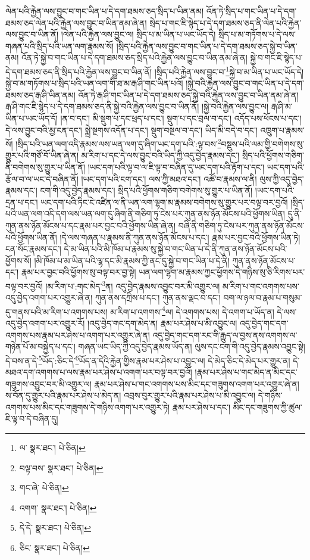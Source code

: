 ལེན་པའི་རྐྱེན་ལས་བྱུང་བ་གང་ཡིན་པ་དེ་དག་ཐམས་ཅད་སྲིད་པ་ཡིན་ནམ། འོན་ཏེ་སྲིད་པ་གང་ཡིན་པ་དེ་དག་ཐམས་ཅད་ལེན་པའི་རྐྱེན་ལས་བྱུང་བ་ཡིན་ནམ་ཞེ་ན། སྲེད་པ་གང་ཇི་སྙེད་པ་དེ་དག་ཐམས་ཅད་ནི་ལེན་པའི་རྐྱེན་ལས་བྱུང་བ་ཡིན་ནོ། །ལེན་པའི་རྐྱེན་ལས་བྱུང་ལ། སྲིད་པ་མ་ཡིན་པ་ཡང་ཡོད་དེ། སྲིད་པ་མ་གཏོགས་པ་དེ་ལས་གཞན་པའི་སྲིད་པའི་ཡན་ལག་རྣམས་སོ། །སྲིད་པའི་རྐྱེན་ལས་བྱུང་བ་གང་ཡིན་པ་དེ་དག་ཐམས་ཅད་སྐྱེ་བ་ཡིན་ནམ། འོན་ཏེ་སྐྱེ་བ་གང་ཡིན་པ་དེ་དག་ཐམས་ཅད་སྲིད་པའི་རྐྱེན་ལས་བྱུང་བ་ཡིན་ནམ་ཞེ་ན། སྐྱེ་བ་གང་ཇི་སྙེད་པ་དེ་དག་ཐམས་ཅད་ནི་སྲིད་པའི་རྐྱེན་ལས་བྱུང་བ་ཡིན་ནོ། །སྲིད་པའི་རྐྱེན་ལས་བྱུང་བ་\footnote{ལ་  སྣར་ཐང་།  པེ་ཅིན། }སྐྱེ་བ་མ་ཡིན་པ་ཡང་ཡོད་དེ། སྐྱེ་བ་མ་གཏོགས་པ་སྲིད་པའི་ཡན་ལག་གི་ཐ་མ་རྒ་ཤི་གང་ཡིན་པའོ། །སྐྱེ་བའི་རྐྱེན་ལས་བྱུང་བ་གང་ཡིན་པ་དེ་དག་ཐམས་ཅད་རྒ་ཤི་ཡིན་ནམ། འོན་ཏེ་རྒ་ཤི་གང་ཡིན་པ་དེ་དག་ཐམས་ཅད་སྐྱེ་བའི་རྐྱེན་ལས་བྱུང་བ་ཡིན་ནམ་ཞེ་ན། རྒ་ཤི་གང་ཇི་སྙེད་པ་དེ་དག་ཐམས་ཅད་ནི་སྐྱེ་བའི་རྐྱེན་ལས་བྱུང་བ་ཡིན་ནོ། །སྐྱེ་བའི་རྐྱེན་ལས་བྱུང་ལ། རྒ་ཤི་མ་ཡིན་པ་ཡང་ཡོད་དོ། །ན་བ་དང་། མི་སྡུག་པ་དང་ཕྲད་པ་དང་། སྡུག་པ་དང་བྲལ་བ་དང་། འདོད་པས་ཕོངས་པ་དང་། དེ་ལས་བྱུང་བའི་མྱ་ངན་དང་། སྨྲེ་སྔགས་འདོན་པ་དང་། སྡུག་བསྔལ་བ་དང་། ཡིད་མི་བདེ་བ་དང་། འཁྲུག་པ་རྣམས་སོ། །སྲིད་པའི་ཡན་ལག་འདི་རྣམས་ལས་ཡན་ལག་དུ་ཞིག་ཡང་དག་པའི་:ལྟ་བས་\footnote{བལྟ་བས་  སྣར་ཐང་།  པེ་ཅིན། }བསྡུས་པའི་ལམ་གྱི་བགེགས་སུ་གྱུར་པའི་གཙོ་བོ་ཡིན་ཞེ་ན། མ་རིག་པ་དང་དེ་ལས་བྱུང་བའི་ཡིད་ཀྱི་འདུ་བྱེད་རྣམས་དང་། སྲིད་པའི་ཕྱོགས་གཅིག་ནི་བགེགས་སུ་གྱུར་པ་ཡིན་ནོ། །ཡང་དག་པའི་ལྟ་བ་ལ་ཇི་ལྟ་བ་བཞིན་དུ་ཡང་དག་པའི་རྟོག་པ་དང་། ཡང་དག་པའི་རྩོལ་བ་ལ་ཡང་དེ་བཞིན་ནོ། །ཡང་དག་པའི་ངག་དང་། ལས་ཀྱི་མཐའ་དང་། འཚོ་བ་རྣམས་ལ་ནི། ལུས་ཀྱི་འདུ་བྱེད་རྣམས་དང་། ངག་གི་འདུ་བྱེད་རྣམས་དང་། སྲིད་པའི་ཕྱོགས་གཅིག་བགེགས་སུ་གྱུར་པ་ཡིན་ནོ། །ཡང་དག་པའི་དྲན་པ་དང་། ཡང་དག་པའི་ཏིང་ངེ་འཛིན་ལ་ནི་ཡན་ལག་ལྷག་མ་རྣམས་བགེགས་སུ་གྱུར་པར་བལྟ་བར་བྱའོ། །སྲིད་པའི་ཡན་ལག་འདི་དག་ལས་ཡན་ལག་དུ་ཞིག་ནི་གཅིག་ཏུ་ངེས་པར་ཀུན་ནས་ཉོན་མོངས་པའི་ཕྱོགས་ཡིན། དུ་ནི་ཀུན་ནས་ཉོན་མོངས་པ་དང་རྣམ་པར་བྱང་བའི་ཕྱོགས་ཡིན་ཞེ་ན། བཞི་ནི་གཅིག་ཏུ་ངེས་པར་ཀུན་ནས་ཉོན་མོངས་པའི་ཕྱོགས་ཡིན་ནོ། །དེ་ལས་གཞན་པ་རྣམས་ནི་ཀུན་ནས་ཉོན་མོངས་པ་དང་། རྣམ་པར་བྱང་བའི་ཕྱོགས་ཡིན་ཏེ། ངན་སོང་རྣམས་དང་། དེ་མ་ཡིན་པའི་མི་ཁོམ་པ་རྣམས་སུ་སྐྱེ་བ་གང་ཡིན་པ་དེ་ནི་ཀུན་ནས་ཉོན་མོངས་པའི་ཕྱོགས་སོ། །མི་ཁོམ་པ་མ་ཡིན་པའི་ལྷ་དང་མི་རྣམས་ཀྱི་ནང་དུ་སྐྱེ་བ་གང་ཡིན་པ་དེ་ནི། ཀུན་ནས་ཉོན་མོངས་པ་དང་། རྣམ་པར་བྱང་བའི་ཕྱོགས་སུ་བལྟ་བར་བྱ་སྟེ། ཡན་ལག་ལྷག་མ་རྣམས་ཀྱང་ཕྱོགས་དེ་གཉིས་སུ་ཅི་རིགས་པར་བལྟ་བར་བྱའོ། །མ་རིག་པ་:གང་མེད་\footnote{གང་ཞེ་  པེ་ཅིན། }ན། འདུ་བྱེད་རྣམས་འབྱུང་བར་མི་འགྱུར་ལ། མ་རིག་པ་གང་འགགས་པས་འདུ་བྱེད་འགག་པར་འགྱུར་ཞེ་ན། ཀུན་ནས་དཀྲིས་པ་དང་། ཀུན་ནས་ལྡང་བ་དང་། བག་ལ་ཉལ་བ་རྣམ་པ་གསུམ་དུ་གནས་པའི་མ་རིག་པ་འགགས་པས། མ་རིག་པ་འགགས་\footnote{འགག་  སྣར་ཐང་།  པེ་ཅིན། }ལ། དེ་འགགས་པས། དེ་འགག་པ་ཡོད་ན། དེ་ལས་འདུ་བྱེད་འགག་པར་འགྱུར་རོ། །འདུ་བྱེད་གང་དག་མེད་ན། རྣམ་པར་ཤེས་པ་མི་འབྱུང་ལ། འདུ་བྱེད་གང་དག་འགགས་པས་རྣམ་པར་ཤེས་པ་འགག་པར་འགྱུར་ཞེ་ན། འདུ་བྱེད་གང་དག་རང་གི་རྒྱུད་ལ་བྱས་ནས་འགགས་ལ་གཉེན་པོ་མ་བསྐྱེད་པ་དང་། གཞན་ཡང་ཡིད་ཀྱི་འདུ་བྱེད་རྣམས་ཡོད་ན། ལུས་དང་ངག་གི་འདུ་བྱེད་རྣམས་འབྱུང་སྟེ། དེ་བས་ན་དེ་\footnote{དེ་དེ་  སྣར་ཐང་།  པེ་ཅིན། }ཡོད་:ཅིང་དེ་\footnote{ཅིང་  སྣར་ཐང་།  པེ་ཅིན། }ཡོད་ན་དེའི་རྐྱེན་གྱིས་རྣམ་པར་ཤེས་པ་འབྱུང་ལ། དེ་མེད་ཅིང་དེ་མེད་པར་གྱུར་ན། དེ་མཐའ་དག་འགགས་པ་ལས་རྣམ་པར་ཤེས་པ་འགག་པར་བལྟ་བར་བྱའོ། །རྣམ་པར་ཤེས་པ་གང་མེད་ན་མིང་དང་གཟུགས་འབྱུང་བར་མི་འགྱུར་ལ། རྣམ་པར་ཤེས་པ་གང་འགགས་པས་མིང་དང་གཟུགས་འགག་པར་འགྱུར་ཞེ་ན། ས་བོན་དུ་གྱུར་པའི་རྣམ་པར་ཤེས་པ་མེད་ན། འབྲས་བུར་གྱུར་པའི་རྣམ་པར་ཤེས་པ་མི་འབྱུང་ལ། དེ་གཉིས་འགགས་པས་མིང་དང་གཟུགས་དེ་གཉིས་འགག་པར་འགྱུར་ཏེ། རྣམ་པར་ཤེས་པ་དང་། མིང་དང་གཟུགས་ཀྱི་ཚུལ་ཇི་ལྟ་བ་དེ་བཞིན་དུ། 